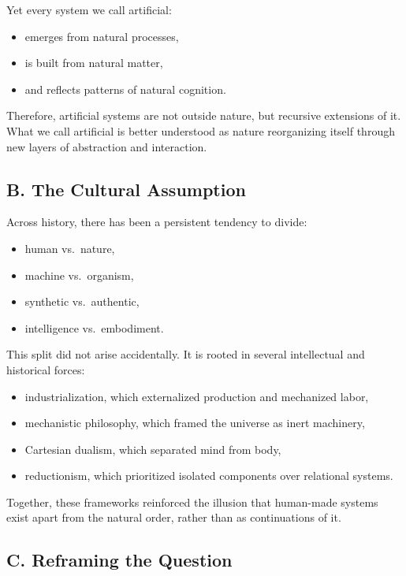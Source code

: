 \documentclass[12pt]{article}
\begin{document}
Yet every system we call artificial:
\begin{itemize}
    \item emerges from natural processes,
    \item is built from natural matter,
    \item and reflects patterns of natural cognition.
\end{itemize}

Therefore, artificial systems are not outside nature, but recursive extensions of it. What we call artificial is better understood as nature reorganizing itself through new layers of abstraction and interaction.

\subsection*{B. The Cultural Assumption}

Across history, there has been a persistent tendency to divide:
\begin{itemize}
    \item human vs.\ nature,
    \item machine vs.\ organism,
    \item synthetic vs.\ authentic,
    \item intelligence vs.\ embodiment.
\end{itemize}

This split did not arise accidentally. It is rooted in several intellectual and historical forces:
\begin{itemize}
    \item industrialization, which externalized production and mechanized labor,
    \item mechanistic philosophy, which framed the universe as inert machinery,
    \item Cartesian dualism, which separated mind from body,
    \item reductionism, which prioritized isolated components over relational systems.
\end{itemize}

Together, these frameworks reinforced the illusion that human-made systems exist apart from the natural order, rather than as continuations of it.

\subsection*{C. Reframing the Question}
\end{document}
